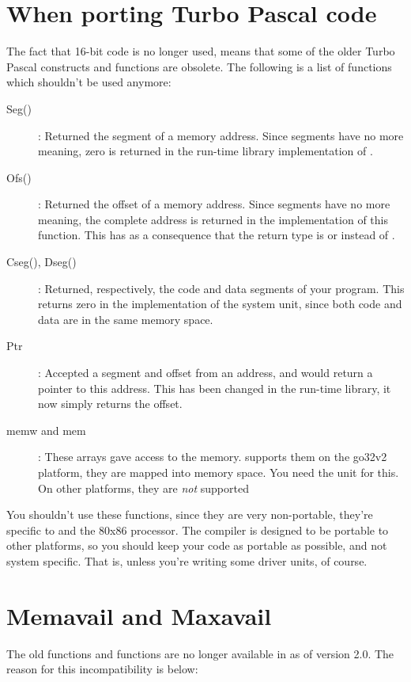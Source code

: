 \section{When porting Turbo Pascal code}
The fact that 16-bit code is no longer used, means that some of the older
Turbo Pascal constructs and functions are obsolete. The following is a
list of functions which shouldn't be used anymore:
\begin{description}
\item [Seg()]: Returned the segment of a memory address. Since segments have
no more meaning, zero is returned in the \fpc run-time library implementation of
.
\item [Ofs()]: Returned the offset of a memory address. Since segments have
no more meaning, the complete address is returned in the \fpc implementation
of this function. This has as a consequence that the return type is
 or  instead of .
\item [Cseg(), Dseg()]: Returned, respectively, the code and data segments
of your program.  This returns zero in the \fpc implementation of the
system unit, since both code and data are in the same memory space.
\item [Ptr]: Accepted a segment and offset from an address, and would return
a pointer to this address. This has been changed in the run-time library, it
now simply returns the offset.
\item [memw and mem]: These arrays gave access to the \dos memory. \fpc
supports them on the go32v2 platform, they are mapped into \dos memory
space. You need the  unit for this. On other platforms, they are
{\em not} supported
\end{description}

You shouldn't use these functions, since they are very non-portable, they're
specific to \dos and the 80x86 processor. The \fpc compiler is designed to be
portable to other platforms, so you should keep your code as portable as
possible, and not system specific. That is, unless you're writing some driver
units, of course.

\section{Memavail and Maxavail}

The old \tp functions  and  functions are 
no longer available in \fpc as of version 2.0. The reason for this 
incompatibility is below:

